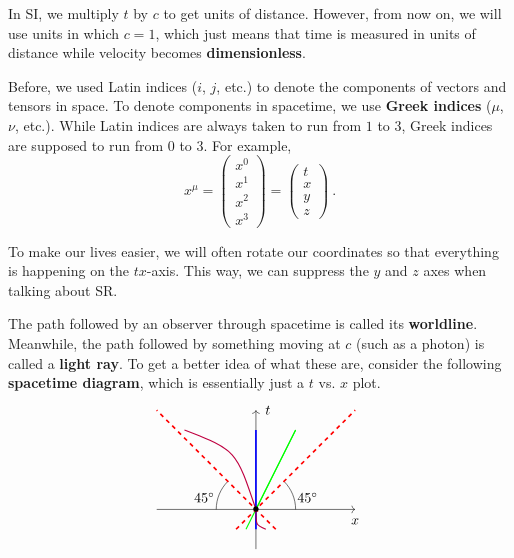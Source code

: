 \documentclass[11pt]{article}
\begin{document}
In SI, we multiply $t$ by $c$ to get units of distance. However, from now on, we will use units in which $c = 1$, which just means that time is measured in units of distance while velocity becomes \textbf{dimensionless}.

Before, we used Latin indices ($i$, $j$, etc.) to denote the components of vectors and tensors in space. To denote components in spacetime, we use \textbf{Greek indices} ($\mu$, $\nu$, etc.). While Latin indices are always taken to run from $1$ to $3$, Greek indices are supposed to run from $0$ to $3$. For example,
\begin{equation}
x^\mu = \begin{pmatrix}
x^0\\
x^1\\
x^2\\
x^3
\end{pmatrix} = \begin{pmatrix}
t\\
x\\
y\\
z
\end{pmatrix}\ .
\end{equation}

To make our lives easier, we will often rotate our coordinates so that everything is happening on the $tx$-axis. This way, we can suppress the $y$ and $z$ axes when talking about SR.

The path followed by an observer through spacetime is called its \textbf{worldline}. Meanwhile, the path followed by something moving at $c$ (such as a photon) is called a \textbf{light ray}. To get a better idea of what these are, consider the following \textbf{spacetime diagram}, which is essentially just a $t$ vs. $x$ plot.
\[
\begin{tikzpicture}
\draw[->] (0,-1) to (0,2.5);
\draw[->] (-2.5,0) to (2.5,0);

\draw[-,very thick,color=blue] (0,-0.5) to (0,2);
\draw[-,thick,color=green] (-0.25,-0.5) to (1,2);
\draw[-,thick,color=green] (0,0) to (1,2);
\draw[-,thick,color=purple] (0.25,-0.5) .. controls (0,-0.4) .. (0,0) .. controls (-0.5,1.5) .. (-1.8,2);

\draw[-] (1,0) arc (0:45:1);
\node at (1.3,0.3) {$45^\circ$};
\draw[-] (-1,0) arc (180:135:1);
\node at (-1.3,0.3) {$45^\circ$};

\draw[-,very thick,dashed,color=red] (-0.5,-0.5) to (2.5,2.5);
\draw[-,very thick,dashed,color=red] (0.5,-0.5) to (-2.5,2.5);

\node at (0,0) {$\bullet$};

\node at (2.5,-0.3) {$x$};
\node at (0.3,2.5) {$t$};
\end{tikzpicture}
\]
\end{document}
